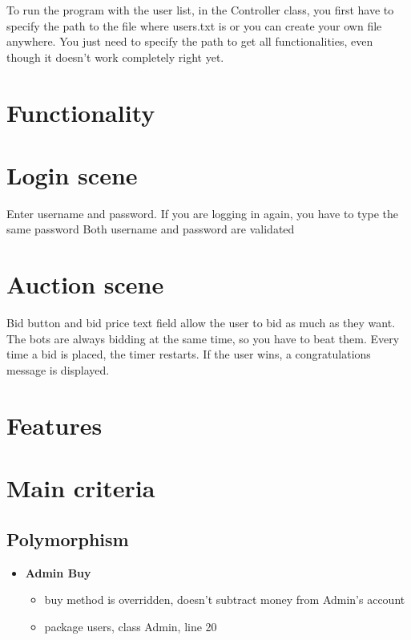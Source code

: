 \documentclass[
]{report}
\providecommand{\tightlist}{%
  \setlength{\itemsep}{0pt}\setlength{\parskip}{0pt}}
\begin{document}
To run the program with the user list, in the Controller class, you first have to specify the path to the file where users.txt is or you can create your own file anywhere. You just need to specify the path to get all functionalities, even though it doesn't work completely right yet.

\hypertarget{functionality}{%
\section{Functionality}\label{functionality}}

\hypertarget{login-scene}{%
\section{Login scene}\label{login-scene}}

Enter username and password.
If you are logging in again, you have to type the same password
Both username and password are validated

\hypertarget{auction-scene}{%
\section{Auction scene}\label{auction-scene}}

Bid button and bid price text field allow the user to bid as much as they want.
The bots are always bidding at the same time, so you have to beat them.
Every time a bid is placed, the timer restarts.
If the user wins, a congratulations message is displayed.

\hypertarget{features}{%
\section{Features}\label{features}}

\hypertarget{main-criteria}{%
\section{Main criteria}\label{main-criteria}}

\hypertarget{polymorphism}{%
\subsection{Polymorphism}\label{polymorphism}}

\begin{itemize}
\tightlist
\item
  \textbf{Admin Buy}

  \begin{itemize}
  \tightlist
  \item
    buy method is overridden, doesn't subtract money from Admin's account
  \item
    package users, class Admin, line 20
  \end{itemize}
\end{itemize}
\end{document}
